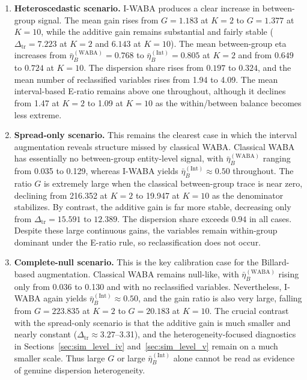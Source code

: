 \documentclass[preprint, times, 12pt, authoryear]{elsarticle}
\begin{document}
\begin{enumerate}
	\item \textbf{Heteroscedastic scenario.} I-WABA produces a clear increase in between-group signal. The mean gain rises from $G=1.183$ at $K=2$ to $G=1.377$ at $K=10$, while the additive gain remains substantial and fairly stable ($\Delta_{\mathrm{tr}}=7.223$ at $K=2$ and $6.143$ at $K=10$). The mean between-group eta increases from $\bar\eta_B^{(\mathrm{WABA})}=0.768$ to $\bar\eta_B^{(\mathrm{Int})}=0.805$ at $K=2$ and from $0.649$ to $0.724$ at $K=10$. The dispersion share rises from $0.197$ to $0.324$, and the mean number of reclassified variables rises from 1.94 to 4.09. The mean interval-based E-ratio remains above one throughout, although it declines from 1.47 at $K=2$ to 1.09 at $K=10$ as the within/between balance becomes less extreme.
	
	\item \textbf{Spread-only scenario.} This remains the clearest case in which the interval augmentation reveals structure missed by classical WABA. Classical WABA has essentially no between-group entity-level signal, with $\bar\eta_B^{(\mathrm{WABA})}$ ranging from 0.035 to 0.129, whereas I-WABA yields $\bar\eta_B^{(\mathrm{Int})}\approx 0.50$ throughout. The ratio $G$ is extremely large when the classical between-group trace is near zero, declining from 216.352 at $K=2$ to 19.947 at $K=10$ as the denominator stabilizes. By contrast, the additive gain is far more stable, decreasing only from $\Delta_{\mathrm{tr}}=15.591$ to $12.389$. The dispersion share exceeds $0.94$ in all cases. Despite these large continuous gains, the variables remain within-group dominant under the E-ratio rule, so reclassification does not occur.
	
	\item \textbf{Complete-null scenario.} This is the key calibration case for the Billard-based augmentation. Classical WABA remains null-like, with $\bar\eta_B^{(\mathrm{WABA})}$ rising only from 0.036 to 0.130 and with no reclassified variables. Nevertheless, I-WABA again yields $\bar\eta_B^{(\mathrm{Int})}\approx 0.50$, and the gain ratio is also very large, falling from $G=223.835$ at $K=2$ to $G=20.183$ at $K=10$. The crucial contrast with the spread-only scenario is that the additive gain is much smaller and nearly constant ($\Delta_{\mathrm{tr}}\approx 3.27$--3.31), and the heterogeneity-focused diagnostics in Sections~\ref{sec:sim_level_iv} and~\ref{sec:sim_level_v} remain on a much smaller scale. Thus large $G$ or large $\bar\eta_B^{(\mathrm{Int})}$ alone cannot be read as evidence of genuine dispersion heterogeneity.
	

\end{enumerate}
\end{document}
